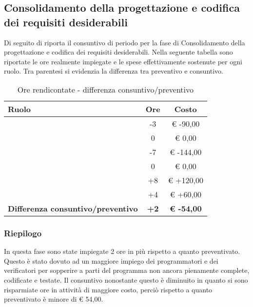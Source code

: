 
			\subsection{Consolidamento della progettazione e codifica dei requisiti desiderabili} %
			\label{sub:consuntivo_consolidamento_req_desiderabili}
				Di seguito di riporta il consuntivo di periodo per la fase di Consolidamento della progettazione e codifica dei requisiti desiderabili. \newline
				Nella seguente tabella sono riportate le ore realmente impiegate e le spese effettivamente sostenute per ogni ruolo. Tra parentesi si evidenzia la differenza tra preventivo e consuntivo.
				\begin{table}[!h]
					\begin{center}
						\begin{tabularx}{0.90\textwidth}{|X|c|c|}
							\hline
							\textbf{Ruolo} & \textbf{Ore} & \textbf{Costo} \\
							\hline
							\roleProjectManager & -3 & \euro{} -90,00 \\
							\hline
							\roleAnalyst & 0 &  \euro{} 0,00 \\
							\hline
							\roleDesigner & -7 & \euro{} -144,00 \\
							\hline
							\roleAdministrator & 0  & \euro{} 0,00 \\
							\hline
							\roleProgrammer & +8 & \euro{} +120,00 \\
							\hline
							\roleVerifier & +4 & \euro{} +60,00 \\
							\hline
							\textbf{Differenza consuntivo/preventivo} & \textbf{+2} & \textbf{\euro{} -54,00} \\
							\hline
						\end{tabularx}
					\end{center}
				\caption{Ore rendicontate - differenza consuntivo/preventivo}
				\end{table}

				\subsubsection{Riepilogo} %
				In questa fase sono state impiegate 2 ore in più rispetto a quanto preventivato. \newline
				Questo è stato dovuto ad un maggiore impiego dei programmatori e dei verificatori per sopperire a parti del programma non ancora pienamente complete, codificate e testate. \newline
				Il consuntivo nonostante questo è diminuito in quanto si sono risparmiate ore in attività di maggiore costo, perciò rispetto a quanto preventivato è minore di \euro{} 54,00.


